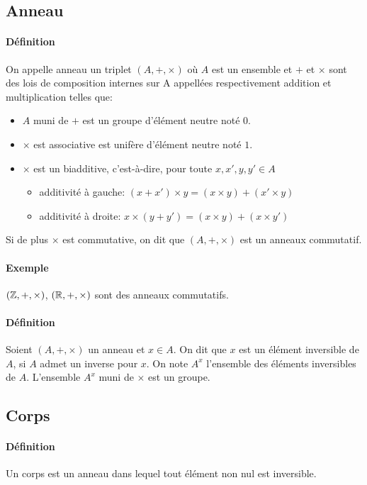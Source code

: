 %
\subsection{Anneau}
%
\paragraph{Définition} On appelle anneau un triplet $(A, +, \times)$ où $A$ est un ensemble et $+$ et $\times$ sont des lois de composition internes sur A appellées respectivement addition et multiplication telles que:
\begin{itemize}
  \item $A$ muni de $+$ est un groupe d'élément neutre noté $0$.
  \item $\times$ est associative est unifère d'élément neutre noté $1$.
  \item $\times$ est un biadditive, c'est-à-dire, pour toute $x, x', y, y' \in A$
    \begin{itemize}
      \item additivité à gauche: $(x + x') \times y = (x \times y)+(x' \times y)$
      \item additivité à droite: $x \times (y + y') = (x \times y)+(x \times y')$
    \end{itemize}
\end{itemize}
Si de plus $\times$ est commutative, on dit que $(A, +, \times)$ est un anneaux commutatif.

\paragraph{Exemple}  $(\mathbb{Z}, +, \times)$, $(\mathbb{R}, +, \times)$ sont des anneaux commutatifs.

\paragraph{Définition} Soient $(A, +, \times)$ un anneau et $x \in A$. On dit que $x$ est un élément inversible de $A$, si $A$ admet un inverse pour $x$. On note $A^{x}$ l'ensemble des éléments inversibles de $A$. L'ensemble $A^{x}$ muni de $\times$ est un groupe.

%
\subsection{Corps}
%
\paragraph{Définition} Un corps est un anneau dans lequel tout élément non nul est inversible.

